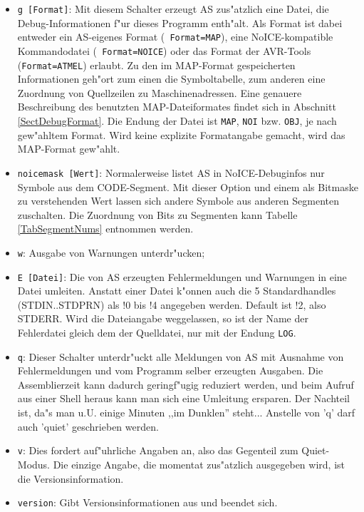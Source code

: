 \documentclass[12pt,a4paper,twoside]{report}
\newcommand{\tty}[1]{{\tt #1}}
\newcommand{\asname}{AS}
\begin{document}
\begin{itemize}
\item{\tty{g [Format]}: Mit diesem Schalter erzeugt \asname{} zus"atzlich eine
      Datei, die Debug-Informationen f"ur dieses Programm enth"alt.
      Als Format ist dabei entweder ein \asname{}-eigenes Format ({\tt
      Format=MAP}), eine NoICE-kompatible Kommandodatei ({\tt
      Format=NOICE}) oder das Format der AVR-Tools ({\tt Format=ATMEL})
      erlaubt.  Zu den im MAP-Format gespeicherten
      Informationen geh"ort zum einen die Symboltabelle, zum anderen eine
      Zuordnung von Quellzeilen zu Maschinenadressen.  Eine genauere
      Beschreibung des benutzten MAP-Dateiformates findet sich in
      Abschnitt \ref{SectDebugFormat}.  Die Endung der Datei ist
      \tty{MAP}, \tty{NOI} bzw. \tty{OBJ}, je nach gew"ahltem Format.
      Wird keine explizite Formatangabe gemacht, wird das MAP-Format
      gew"ahlt.}
\item{\tty{noicemask [Wert]}: Normalerweise listet \asname{} in NoICE-Debuginfos
      nur Symbole aus dem CODE-Segment.  Mit dieser Option und einem als
      Bitmaske zu verstehenden Wert lassen sich andere Symbole aus
      anderen Segmenten zuschalten.  Die Zuordnung von Bits zu Segmenten
      kann Tabelle \ref{TabSegmentNums} entnommen werden.}
\item{\tty{w}: Ausgabe von Warnungen unterdr"ucken;}
\item{\tty{E [Datei]}: Die von \asname{} erzeugten Fehlermeldungen und Warnungen
      in eine Datei umleiten.  Anstatt einer Datei k"onnen auch die 5
      Standardhandles (STDIN..STDPRN) als !0 bis !4 angegeben werden.
      Default ist !2, also STDERR. Wird die Dateiangabe weggelassen,
      so ist der Name der Fehlerdatei gleich dem der Quelldatei, nur
      mit der Endung \tty{LOG}.}
\item{\tty{q}: Dieser Schalter unterdr"uckt alle Meldungen von \asname{} mit
      Ausnahme von Fehlermeldungen und vom Programm selber erzeugten
      Ausgaben.  Die Assemblierzeit kann dadurch geringf"ugig reduziert
      werden, und beim Aufruf aus einer Shell heraus kann man sich eine
      Umleitung ersparen.  Der Nachteil ist, da"s man u.U. einige Minuten
      ,,im Dunklen'' steht...  Anstelle von 'q' darf auch 'quiet' geschrieben
      werden.}
\item{\tty{v}: Dies fordert auf"uhrliche Angaben an, also das Gegenteil
      zum Quiet-Modus.  Die einzige Angabe, die momentat zus"atzlich ausgegeben
      wird, ist die Versionsinformation.}
\item{\tty{version}: Gibt Versionsinformationen aus und beendet sich.}

\end{itemize}
\end{document}
